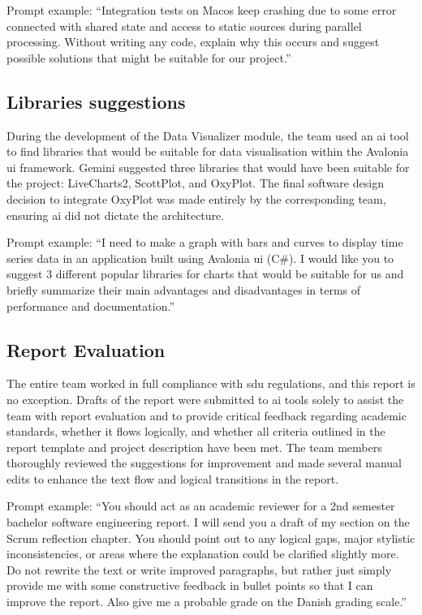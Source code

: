 Prompt example: ``Integration tests on Mac\acrshort{os} keep crashing due to some error connected with shared state and access to static sources during parallel processing. Without writing any code, explain why this occurs and suggest possible solutions that might be suitable for our project.''

\subsection{Libraries suggestions}
During the development of the Data Visualizer module, the team used an \acrshort{ai} tool to find libraries that would be suitable for data visualisation within the Avalonia \acrshort{ui} framework. Gemini suggested three libraries that would have been suitable for the project: LiveCharts2, ScottPlot, and OxyPlot. The final software design decision to integrate OxyPlot was made entirely by the corresponding team, ensuring \acrshort{ai} did not dictate the architecture.

Prompt example: ``I need to make a graph with bars and curves to display time series data in an application built using Avalonia \acrshort{ui} (C\#). I would like you to suggest 3 different popular libraries for charts that would be suitable for us and briefly summarize their main advantages and disadvantages in terms of performance and documentation.''

\subsection{Report Evaluation}
The entire team worked in full compliance with \acrshort{sdu} regulations, and this report is no exception. Drafts of the report were submitted to \acrshort{ai} tools solely to assist the team with report evaluation and to provide critical feedback regarding academic standards, whether it flows logically, and whether all criteria outlined in the report template and project description have been met. The team members thoroughly reviewed the suggestions for improvement and made several manual edits to enhance the text flow and logical transitions in the report.

Prompt example: ``You should act as an academic reviewer for a 2nd semester bachelor software engineering report. I will send you a draft of my section on the Scrum reflection chapter. You should point out to any logical gaps, major stylistic inconsistencies, or areas where the explanation could be clarified slightly more. Do not rewrite the text or write improved paragraphs, but rather just simply provide me with some constructive feedback in bullet points so that I can improve the report. Also give me a probable grade on the Danish grading scale.''

